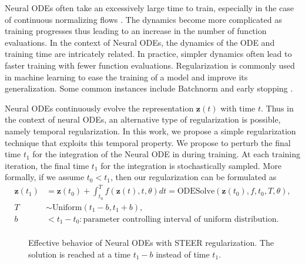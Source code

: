 Neural ODEs often take an excessively large time to train, especially in the case of continuous normalizing flows \cite{grathwohl2018ffjord} . The dynamics become more complicated as training progresses thus leading to an increase in the number of function evaluations. In the context of Neural ODEs, the dynamics of the ODE and training time are intricately related. In practice, simpler dynamics \cite{dupont2019augmented, finlay2020train} often lead to faster training with fewer function evaluations. Regularization is commonly used in machine learning to ease the training of a model and improve its generalization. Some common instances include Batchnorm \cite{ioffe2015batch} and early stopping \cite{yao2007early}. 




Neural ODEs continuously evolve the representation $\mathbf{z}(t)$ with time $t$. Thus in the context of neural ODEs, an alternative type of regularization is possible, namely temporal regularization. In this work, we propose a simple regularization technique that exploits this temporal property. We propose to perturb the final time $t_1$ for the integration of the Neural ODE in  during training. At each training iteration, the final time $t_1$ for the integration is stochastically sampled. More formally, if we assume $t_0<t_1$, then our regularization can be formulated as 
\begin{equation}
	\begin{split}
		\label{skip_formulation}
		\mathbf{z}(t_1) &= \mathbf{z}(t_0) + \int_{t_0}^{T} f(\mathbf{z}(t) , t , \theta) dt = \text{ODESolve}(\mathbf{z}(t_0) , f , t_0, T , \theta  ), \\
		T &\sim \text{Uniform} ( t_{1}-b, t_{1}+ b ),  \\
		b &< t_1-t_0 :  \text{parameter controlling interval of uniform distribution}. \\
	\end{split}
\end{equation}


\begin{wrapfigure}[10]{r}{0.45\linewidth}
	\centering  
	\caption{Effective behavior of Neural ODEs with STEER regularization. The solution is reached at a time $t_1-b$ instead of time $t_{1}$.}
	\label{fig:behavior}
\end{wrapfigure}

